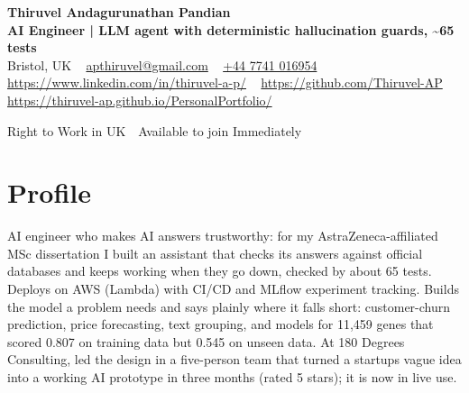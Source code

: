 \documentclass[a4paper,11pt]{article}
\begin{document}
\begin{center}
  {\LARGE\bfseries Thiruvel Andagurunathan Pandian} \\[3pt]
  {\color{headernavy}\small\textbf{AI Engineer | LLM agent with deterministic hallucination guards, \textasciitilde{}65 tests}} \\[3pt]
  {\small
  Bristol, UK\nobreak\ \,\textbar\, \href{mailto:apthiruvel@gmail.com}{apthiruvel@gmail.com}\nobreak\ \,\textbar\, \href{tel:+447741016954}{+44 7741 016954}\nobreak\ \,\textbar\, \href{https://www.linkedin.com/in/thiruvel-a-p/}{https://www.linkedin.com/in/thiruvel-a-p/}\nobreak\ \,\textbar\, \href{https://github.com/Thiruvel-AP}{https://github.com/Thiruvel-AP}\nobreak\ \,\textbar\, \href{https://thiruvel-ap.github.io/PersonalPortfolio/}{https://thiruvel-ap.github.io/PersonalPortfolio/}}\par\vspace{4pt}
  \noindent{} Right to Work in UK \,\textbar\, Available to join Immediately
\end{center}

\section{Profile}
AI engineer who makes AI answers trustworthy: for my AstraZeneca-affiliated MSc dissertation I built an assistant that checks its answers against official databases and keeps working when they go down, checked by about 65 tests. Deploys on AWS (Lambda) with CI/CD and MLflow experiment tracking. Builds the model a problem needs and says plainly where it falls short: customer-churn prediction, price forecasting, text grouping, and models for 11,459 genes that scored 0.807 on training data but 0.545 on unseen data. At 180 Degrees Consulting, led the design in a five-person team that turned a startup\textquotesingle{}s vague idea into a working AI prototype in three months (rated 5 stars); it is now in live use.
\end{document}
